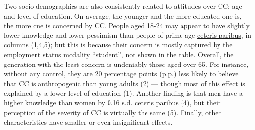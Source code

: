 \documentclass[english,5p,authoryear]{elsarticle}
\begin{document}
%
Two socio-demographics are also consistently related to attitudes over CC: age and level of education. On average, the younger and the more educated one is, the more one is concerned by CC. People aged 18-24 may appear to have slightly lower knowledge and lower pessimism than people of prime age \uline{ceteris paribus}, in columns (1,4,5); but this is because their concern is mostly captured by the employment status modality ``student'', not shown in the table. Overall, the generation with the least concern is undeniably those aged over 65. For instance, without any control, they are 20 percentage points (p.p.) less likely to believe that CC is anthropogenic than young adults (2) --- though most of this effect is explained by a lower level of education (1). Another finding is that men have a higher knowledge than women by 0.16 s.d. \uline{ceteris paribus} (4), but their perception of the severity of CC is virtually the same (5). Finally, other characteristics have smaller or even insignificant effects. 
\end{document}
